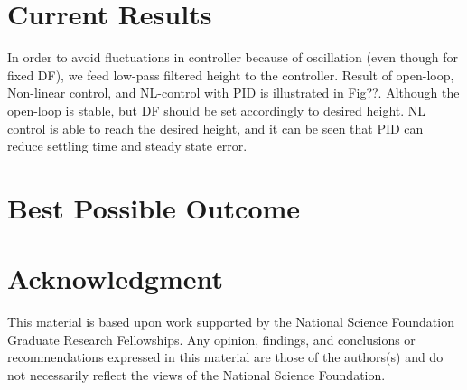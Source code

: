 \documentclass[letterpaper,twocolumn]{article}
\begin{document}
\section*{Current Results}
In order to avoid fluctuations in controller because of oscillation (even though for fixed DF), we feed low-pass filtered height to the controller. Result of open-loop, Non-linear control, and NL-control with PID is illustrated in Fig??. Although the open-loop is stable, but DF should be set accordingly to desired height. NL control is able to reach the desired height, and it can be seen that PID can reduce settling time and steady state error. 

\section*{Best Possible Outcome}

\section*{Acknowledgment}
This material is based upon work supported by the National Science Foundation Graduate Research Fellowships. Any opinion, findings, and conclusions or recommendations expressed in this material are those of the authors(s) and do not necessarily reflect the views of the National Science Foundation.



\end{document}
